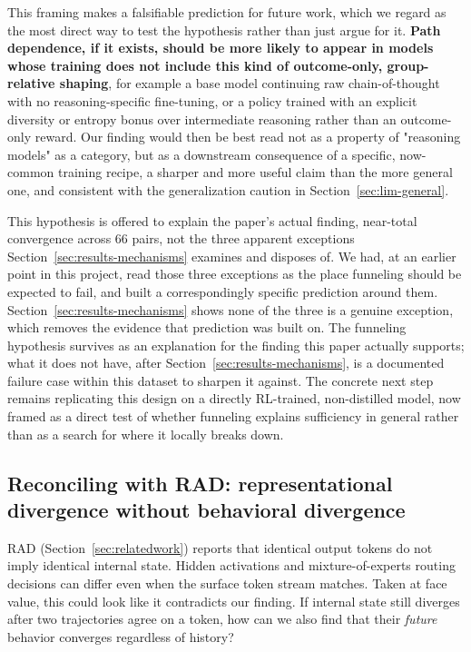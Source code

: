 \documentclass{article}
\begin{document}
This framing makes a falsifiable prediction for future work, which we regard as the most direct way to test the hypothesis rather than just argue for it. \textbf{Path dependence, if it exists, should be more likely to appear in models whose training does not include this kind of outcome-only, group-relative shaping}, for example a base model continuing raw chain-of-thought with no reasoning-specific fine-tuning, or a policy trained with an explicit diversity or entropy bonus over intermediate reasoning rather than an outcome-only reward. Our finding would then be best read not as a property of "reasoning models" as a category, but as a downstream consequence of a specific, now-common training recipe, a sharper and more useful claim than the more general one, and consistent with the generalization caution in Section~\ref{sec:lim-general}.

This hypothesis is offered to explain the paper's actual finding, near-total convergence across 66 pairs, not the three apparent exceptions Section~\ref{sec:results-mechanisms} examines and disposes of. We had, at an earlier point in this project, read those three exceptions as the place funneling should be expected to fail, and built a correspondingly specific prediction around them. Section~\ref{sec:results-mechanisms} shows none of the three is a genuine exception, which removes the evidence that prediction was built on. The funneling hypothesis survives as an explanation for the finding this paper actually supports; what it does not have, after Section~\ref{sec:results-mechanisms}, is a documented failure case within this dataset to sharpen it against. The concrete next step remains replicating this design on a directly RL-trained, non-distilled model, now framed as a direct test of whether funneling explains sufficiency in general rather than as a search for where it locally breaks down.

\subsection{Reconciling with RAD: representational divergence without behavioral divergence}
\label{sec:discussion-rad}

RAD \citep{rad2026} (Section~\ref{sec:relatedwork}) reports that identical output tokens do not imply identical internal state. Hidden activations and mixture-of-experts routing decisions can differ even when the surface token stream matches. Taken at face value, this could look like it contradicts our finding. If internal state still diverges after two trajectories agree on a token, how can we also find that their \emph{future} behavior converges regardless of history?
\end{document}
